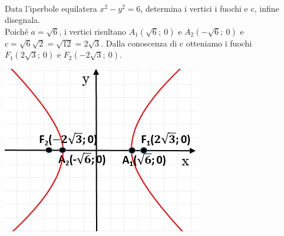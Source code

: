 \begin{esempio}
~

  \begin{minipage}[c]{.6\textwidth}
    Data l'iperbole equilatera $ x^{2} - y^{2} =6$, determina i 
vertici i fuochi e c, infine disegnala.\\
    Poiché $a= \sqrt{6} $, i vertici risultano $ A_{1} 
\left(\sqrt{6};~ 0\right)$ e $ A_{2} \left(-\sqrt{6};~ 0\right)$ e $c= 
\sqrt{6}  \sqrt{2} = \sqrt{12} =2 \sqrt{3} $. Dalla conoscenza di c 
otteniamo i fuochi $ F_{1} \left(2\sqrt{3};~ 0\right)$ e $ F_{2} 
\left(-2\sqrt{3}; ~0\right)$.
  \end{minipage}
  \hspace{.2cm}
  \begin{minipage}[c]{.35\textwidth}
    \includegraphics[width=\textwidth]{img/equilatera1.jpg}
  \end{minipage}
\end{esempio}

